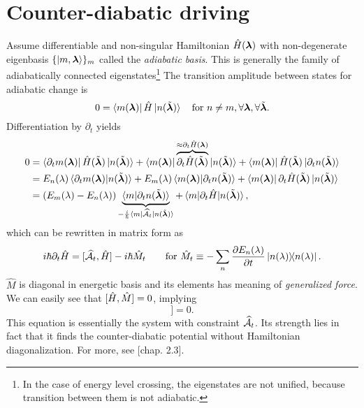 \section{Counter-diabatic driving}

Assume differentiable and non-singular Hamiltonian $\HH(\llambda)$ with non-degenerate eigenbasis $\{\ket{m,\llambda}\}_m$ called the \emph{adiabatic basis}. This is generally the family of adiabatically connected eigenstates\footnote{In the case of energy level crossing, the eigenstates are not unified, because transition between them is not adiabatic.} The transition amplitude between states for adiabatic change is
\begin{equation}
    0=\bra{m(\llambda)}\HH\ket{n(\tilde\llambda)} \quad \text{for }n\neq m, \forall \llambda,\forall \tilde \llambda.
\end{equation}
Differentiation by $\partial_t$ yields
\begin{equation}
    \begin{split}
        0&=\bra{\partial_t m(\llambda)}\HH(\tilde \llambda)\ket{n(\tilde\llambda)}+ \bra{m(\llambda)}\overbrace{\partial_t\HH(\tilde \llambda)}^{\approx \partial_t\HH(\llambda)}\ket{n(\tilde\llambda)}+ \bra{m(\llambda)}\HH(\tilde \llambda)\ket{\partial_t n(\tilde \llambda)}\\
        &=E_n(\lambda)\braket{\partial_t m(\llambda)|n(\tilde \llambda)} + E_m(\lambda)\braket{m(\llambda)|\partial_t n(\tilde \llambda)}+ \bra{m(\llambda)}\partial_t \HH(\tilde\llambda)\ket{n(\tilde \llambda)}\\
        &= (E_m(\lambda)-E_n(\lambda))\underbrace{\braket{m|\partial_t n(\tilde \llambda)}}_{-\frac{i}{\hbar}\bra{m}\AA_t\ket{n(\tilde \llambda)}} + \braket{m|\partial_t\HH|n(\tilde \llambda)},
    \end{split}
\end{equation}
which can be rewritten in matrix form as
\begin{equation}
    i\hbar\partial_t\HH=[\AA_t,\HH]-i\hbar \hat{M}_t\qquad \text{for } \hat{M}_t\equiv -\sum_n\pder{E_n(\lambda)}{t}\ket{n(\lambda)}\!\!\bra{n(\lambda)}.
\end{equation}
$\hat{M}$ is diagonal in energetic basis and its elements has meaning of \emph{generalized force}. We can easily see that $[\HH,\hat{M}]=0$, implying
\begin{equation}
    [\HH,i\hbar\partial_t\HH-[\AA_t,\HH]]=0.
    \label{eq:komutation}
\end{equation}
This equation is essentially the system with constraint $\AA_t$. Its strength lies in fact that it finds the counter-diabatic potential without Hamiltonian diagonalization. For more, see \cite{kolodrubez}[chap. 2.3].











